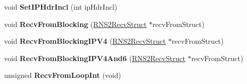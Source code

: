 \begin{DoxyCompactItemize}
\item 
\hypertarget{class_rak_net_1_1_r_n_s2___berkley_a2e62138b5f0664b7d69012c960a4770c}{void {\bfseries Set\-I\-P\-Hdr\-Incl} (int ip\-Hdr\-Incl)}\label{class_rak_net_1_1_r_n_s2___berkley_a2e62138b5f0664b7d69012c960a4770c}

\item 
\hypertarget{class_rak_net_1_1_r_n_s2___berkley_a260c7b6725c69be155c1645e043c868a}{void {\bfseries Recv\-From\-Blocking} (\hyperlink{struct_rak_net_1_1_r_n_s2_recv_struct}{R\-N\-S2\-Recv\-Struct} $\ast$recv\-From\-Struct)}\label{class_rak_net_1_1_r_n_s2___berkley_a260c7b6725c69be155c1645e043c868a}

\item 
\hypertarget{class_rak_net_1_1_r_n_s2___berkley_afc582ba7866dd3d880ee31c487142513}{void {\bfseries Recv\-From\-Blocking\-I\-P\-V4} (\hyperlink{struct_rak_net_1_1_r_n_s2_recv_struct}{R\-N\-S2\-Recv\-Struct} $\ast$recv\-From\-Struct)}\label{class_rak_net_1_1_r_n_s2___berkley_afc582ba7866dd3d880ee31c487142513}

\item 
\hypertarget{class_rak_net_1_1_r_n_s2___berkley_ae6bb178081ac5dd226ae80454fb939b3}{void {\bfseries Recv\-From\-Blocking\-I\-P\-V4\-And6} (\hyperlink{struct_rak_net_1_1_r_n_s2_recv_struct}{R\-N\-S2\-Recv\-Struct} $\ast$recv\-From\-Struct)}\label{class_rak_net_1_1_r_n_s2___berkley_ae6bb178081ac5dd226ae80454fb939b3}

\item 
\hypertarget{class_rak_net_1_1_r_n_s2___berkley_a3cbcca9ee5f301af2fd2c63225e0c773}{unsigned {\bfseries Recv\-From\-Loop\-Int} (void)}\label{class_rak_net_1_1_r_n_s2___berkley_a3cbcca9ee5f301af2fd2c63225e0c773}

\end{DoxyCompactItemize}
